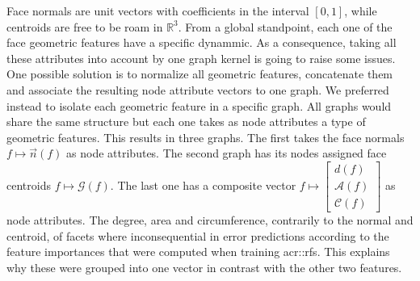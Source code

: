         Face normals are unit vectors with coefficients in the interval \([0, 1]\), while centroids are free to be roam in \(\mathbb{R}^3\).
        From a global standpoint, each one of the face geometric features have a specific dynammic.
        As a consequence, taking all these attributes into account by one graph kernel is going to raise some issues.
        One possible solution is to normalize all geometric features, concatenate them and associate the resulting node attribute vectors to one graph.
        We preferred instead to isolate each geometric feature in a specific graph.
        All graphs would share the same structure but each one takes as node attributes a type of geometric features.
        This results in three graphs.
        The first takes the face normals \(f \mapsto \vec{n}\left(f\right)\) as node attributes.
        The second graph has its nodes assigned face centroids \(f \mapsto \mathscr{G}\left(f\right)\).
        The last one has a composite vector \(f \mapsto \begin{bmatrix}
            d\left(f\right)\\
            \mathscr{A}\left(f\right)\\
            \mathscr{C}\left(f\right)            
        \end{bmatrix}\) as node attributes.
        The degree, area and circumference, contrarily to the normal and centroid, of facets where inconsequential in error predictions according to the feature importances that were computed when training \glspl{acr::rf}.
        This explains why these were grouped into one vector in contrast with the other two features.\\

